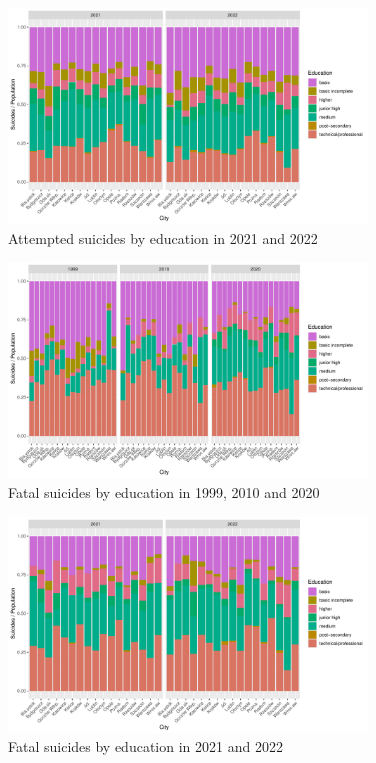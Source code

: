 \documentclass{article}
\begin{document}
\begin{figure}[H]
    \centering
    \includegraphics[width=0.85\textwidth]{imgs/education_city_att_suicides-2122.pdf}
    \caption{Attempted suicides by education  in 2021 and 2022}
    \label{fig:education_city_att_suicides-2122}
\end{figure}

\begin{figure}[H]
    \centering
    \includegraphics[width=0.85\textwidth]{imgs/education_city_fat_suicides-991020.pdf}
    \caption{Fatal suicides by education  in 1999, 2010 and 2020}
    \label{fig:education_city_fat_suicides-991020}
\end{figure}

\begin{figure}[H]
    \centering
    \includegraphics[width=0.85\textwidth]{imgs/education_city_fat_suicides-2122.pdf}
    \caption{Fatal suicides by education  in 2021 and 2022}
    \label{fig:education_city_fat_suicides-2122}
\end{figure}
\end{document}
